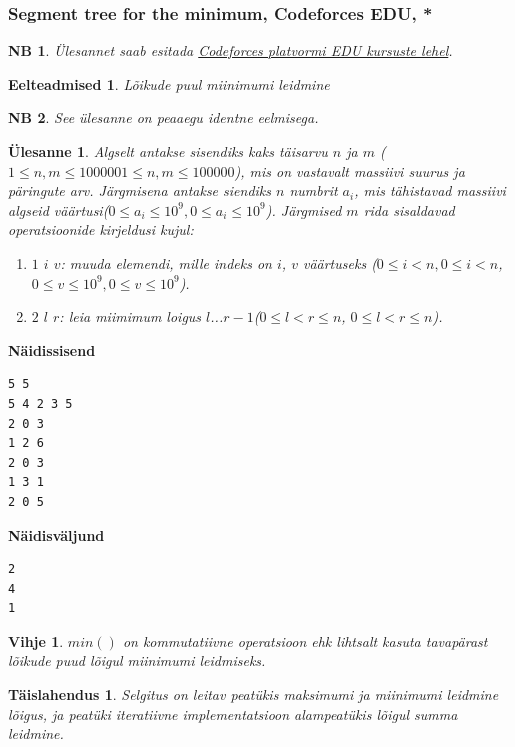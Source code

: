 \documentclass{trkut}
\newtheorem*{prereq}{Eelteadmised}
\newtheorem*{extra}{NB}
\newtheorem*{vihje}{Vihje}
\newtheorem*{solution}{Täislahendus}
\newtheorem*{Text}{Ülesanne}
\begin{document}
\subsubsection{Segment tree for the minimum, Codeforces EDU, *}
\begin{extra}
Ülesannet saab esitada \href{https://codeforces.com/edu/course/2/lesson/4/1/practice/contest/273169/problem/B}{Codeforces platvormi EDU kursuste lehel}.
\end{extra}
\begin{prereq}
Lõikude puul miinimumi leidmine
\end{prereq}
\begin{extra}
See ülesanne on peaaegu identne eelmisega.
\end{extra}
\begin{Text}
Algselt antakse sisendiks kaks täisarvu $n$ ja $m$ ($1\le n,m\le 1000001\le n,m\le 100000$), mis on vastavalt massiivi suurus ja päringute arv.
Järgmisena antakse siendiks $n$ numbrit $a
_i$, mis tähistavad massiivi algseid väärtusi($0\le a_i\le 10^9,0\le a_i\le 10^9$).
Järgmised $m$ rida sisaldavad operatsioonide kirjeldusi kujul:
\begin{enumerate}
\item $1$ $i$ $v$: muuda elemendi, mille indeks on $i$, $v$ väärtuseks ($0\le i<n, 0\le i<n$, $0\le v\le 10^9, 0\le v\le 10^9$).
\item $2$ $l$ $r$: leia miimimum loigus $l$...$r−1$($0\le l<r\le n$, $0\le l<r\le n$).
\end{enumerate}

\parencite{semin}
\end{Text}



\textbf{Näidissisend}

\begin{verbatim}
5 5
5 4 2 3 5
2 0 3
1 2 6
2 0 3
1 3 1
2 0 5
\end{verbatim}

\textbf{Näidisväljund}

\begin{verbatim}
2
4
1
\end{verbatim}



\begin{vihje}
$min()$ on kommutatiivne operatsioon ehk lihtsalt kasuta tavapärast lõikude puud lõigul miinimumi leidmiseks.
\end{vihje}

\begin{solution}
Selgitus on leitav peatükis maksimumi ja miinimumi leidmine lõigus, ja peatüki iteratiivne implementatsioon alampeatükis lõigul summa leidmine.
\end{solution}
\end{document}
